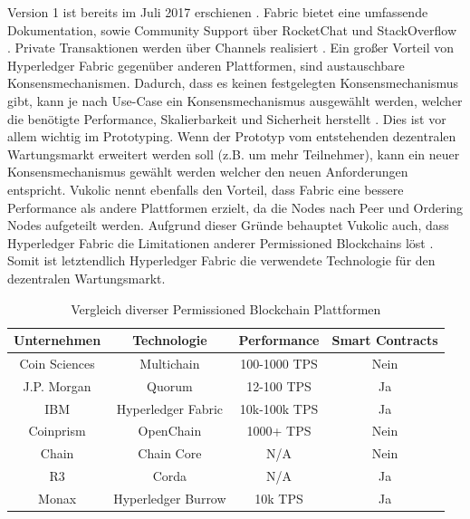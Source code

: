 Version 1 ist bereits im Juli 2017 erschienen \cite{HyperledgerFabricTeamHyperledgerFabricReleases2018}. Fabric bietet eine umfassende Dokumentation, sowie Community Support über RocketChat und StackOverflow \cite{HyperledgerFabricTeamSupportHyperledgerFabric}. Private Transaktionen werden über Channels realisiert \cite{SchererPerformanceScalabilityBlockchain2017}. Ein großer Vorteil von Hyperledger Fabric gegenüber anderen Plattformen, sind austauschbare Konsensmechanismen. Dadurch, dass es keinen festgelegten Konsensmechanismus gibt, kann je nach Use-Case ein Konsensmechanismus ausgewählt werden, welcher die benötigte Performance, Skalierbarkeit und Sicherheit herstellt \cite{VukolicRethinkingPermissionedBlockchains2017}. Dies ist vor allem wichtig im Prototyping. Wenn der Prototyp vom entstehenden dezentralen Wartungsmarkt erweitert werden soll (z.B. um mehr Teilnehmer), kann ein neuer Konsensmechanismus gewählt werden welcher den neuen Anforderungen entspricht. Vukolic nennt ebenfalls den Vorteil, dass Fabric eine bessere Performance als andere Plattformen erzielt, da die Nodes nach Peer und Ordering Nodes aufgeteilt werden. Aufgrund dieser Gründe behauptet Vukolic auch, dass Hyperledger Fabric die Limitationen anderer Permissioned Blockchains löst \cite{VukolicRethinkingPermissionedBlockchains2017}. Somit ist letztendlich Hyperledger Fabric die verwendete Technologie für den dezentralen Wartungsmarkt.

\begin{table}[h]
    \centering
	\begin{tabular}{c c c c}
	\textbf{Unternehmen} & \textbf{Technologie}  & \textbf{Performance} & \textbf{Smart Contracts} \\ \hline
	Coin Sciences & Multichain & 100-1000 TPS & Nein \\ \hline
    J.P. Morgan & Quorum & 12-100 TPS & Ja \\ \hline
    IBM & Hyperledger Fabric & 10k-100k TPS & Ja \\ \hline
    Coinprism & OpenChain & 1000+ TPS & Nein \\ \hline
    Chain & Chain Core & N/A & Nein \\ \hline
    R3 & Corda & N/A & Ja \\ \hline
    Monax & Hyperledger Burrow & 10k TPS & Ja \\
    \end{tabular}
    \caption{Vergleich diverser Permissioned Blockchain Plattformen \cite{BenHamidaBlockchainEnterpriseOverview2017}\cite{HyperledgerBurrowTeamHyperledgerBurrowGitHub2018}}
	\label{tab:perm-comparison}
\end{table}


